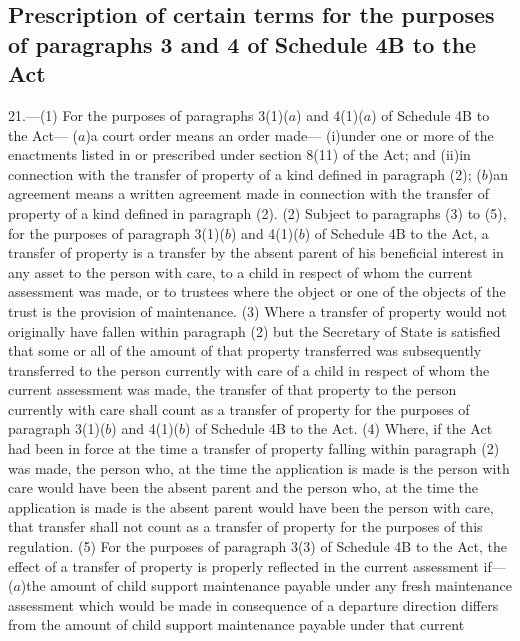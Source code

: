 \documentclass[a4paper]{article}
\newcommand{\parthead}{}
\begin{document}
\renewcommand\parthead{--- Part IV}

\subsection[21. Prescription of certain terms for the
purposes of paragraphs 3 and 4 of Schedule 4B to the Act]{Prescription of certain terms for the
purposes of paragraphs 3 and 4 of Schedule 4B to the Act}

21.—(1) For the purposes
of paragraphs 3(1)($a$) and 4(1)($a$) of Schedule 4B to the Act—
($a$)a court order means an order made—
(i)under one or more of the enactments listed in or prescribed under section
8(11) of the Act; and
(ii)in connection with the transfer of property of a kind defined in paragraph
(2);
($b$)an agreement means a written agreement made in connection with the transfer
of property of a kind defined in paragraph (2).
(2) Subject to paragraphs (3) to (5), for the purposes of paragraph 3(1)($b$) and
4(1)($b$) of Schedule 4B to the Act, a transfer of property is a transfer by the
absent parent of his beneficial interest in any asset to the person with care,
to a child in respect of whom the current assessment was made, or to trustees
where the object or one of the objects of the trust is the provision of
maintenance.
(3) Where a transfer of property would not originally have fallen within
paragraph (2) but the Secretary of State is satisfied that some or all of the
amount of that property transferred was subsequently transferred to the person
currently with care of a child in respect of whom the current assessment was
made, the transfer of that property to the person currently with care shall
count as a transfer of property for the purposes of paragraph 3(1)($b$) and
4(1)($b$) of Schedule 4B to the Act.
(4) Where, if the Act had been in force at the time a transfer of property
falling within paragraph (2) was made, the person who, at the time the
application is made is the person with care would have been the absent parent
and the person who, at the time the application is made is the absent parent
would have been the person with care, that transfer shall not count as a
transfer of property for the purposes of this regulation.
(5) For the purposes of paragraph 3(3) of Schedule 4B to the Act, the effect of
a transfer of property is properly reflected in the current assessment if—
($a$)the amount of child support maintenance payable under any fresh maintenance
assessment which would be made in consequence of a departure direction differs
from the amount of child support maintenance payable under that current
\end{document}
